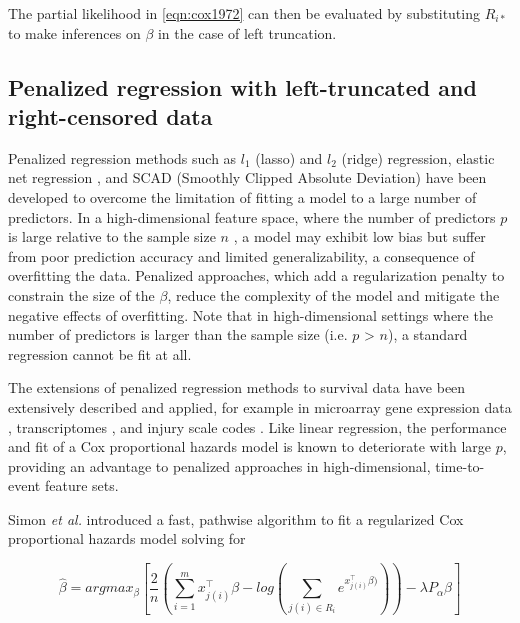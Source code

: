 \documentclass[11pt,final,fleqn]{article}\usepackage[]{graphicx}\usepackage[]{color}
\theoremstyle{plain}
\begin{document}
The partial likelihood in \autoref{eqn:cox1972} can then be evaluated by substituting $R_{i\ast}$ to make inferences on $\beta$ in the case of left truncation. 

\subsection{Penalized regression with left-truncated and right-censored data}
Penalized regression methods such as $l_1$ (lasso) \cite{tibshirani1996regression} and $l_2$ (ridge) \cite{tikhonov1963ridge} regression, elastic net regression \cite{zou2005regularization}, and SCAD (Smoothly Clipped Absolute Deviation) \cite{xie2009scad} have been developed to overcome the limitation of fitting a model to a large number of predictors. In a high-dimensional feature space, where the number of predictors $p$ is large relative to the sample size $n$ , a model may exhibit low bias but suffer from poor prediction accuracy and limited generalizability, a consequence of overfitting the data. Penalized approaches, which add a regularization penalty to constrain the size of the $\beta$, reduce the complexity of the model and mitigate the negative effects of overfitting. Note that in high-dimensional settings where the number of predictors is larger than the sample size (i.e. $p$ > $n$), a standard regression cannot be fit at all.

The extensions of penalized regression methods to survival data have been extensively described and applied, for example in microarray gene expression data \cite{gui2005penalized}, transcriptomes \cite{wu2011penalized}, and injury scale codes \cite{mittal2013penalized}. Like linear regression, the performance and fit of a Cox proportional hazards model is known to deteriorate with large $p$, providing an advantage to penalized approaches in high-dimensional, time-to-event feature sets.

Simon \emph{et al.} \cite{simon2011regularization} introduced a fast, pathwise algorithm to fit a regularized Cox proportional hazards model solving for 

\begin{equation} \label{eqn:simon}
\hat{\beta} = argmax_{\beta}  \left[ \frac{2}{n} \left( \sum_{i=1}^m x_{j(i)}^\intercal\beta - log\left(\sum_{j(i)\in R_i}  e^{x_{j(i)}^\intercal\beta)}\right) \right)  - \lambda P_{\alpha}\beta  \right] 
\end{equation}
\end{document}
